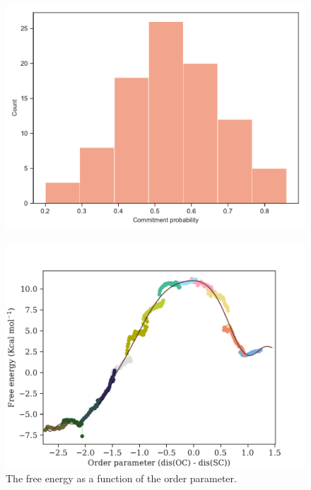 \documentclass[journal=jpcbfk,manuscript=article,layout=traditional]{achemso}
\begin{document}
\begin{figure}[ht!]
\includegraphics[scale=0.5]{figures/comm-60-mat2a.pdf}
\end{figure}

\begin{figure}
\includegraphics[scale=0.5]{figures/mat2a-fenergy.pdf}
\caption{The free energy as a function of the order parameter.}
\end{figure}

\end{document}
